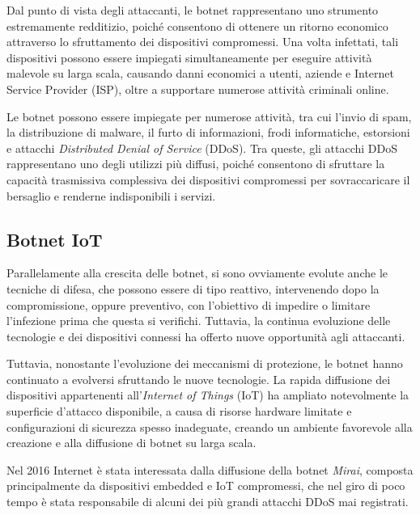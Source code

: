 Dal punto di vista degli attaccanti, le botnet rappresentano uno strumento estremamente redditizio, poiché consentono di ottenere un ritorno economico attraverso lo sfruttamento dei dispositivi compromessi. Una volta infettati, tali dispositivi possono essere impiegati simultaneamente per eseguire attività malevole su larga scala, causando danni economici a utenti, aziende e Internet Service Provider (ISP), oltre a supportare numerose attività criminali online.

Le botnet possono essere impiegate per numerose attività, tra cui l'invio di spam, la distribuzione di malware, il furto di informazioni, frodi informatiche, estorsioni e attacchi \textit{Distributed Denial of Service} (DDoS). Tra queste, gli attacchi DDoS rappresentano uno degli utilizzi più diffusi, poiché consentono di sfruttare la capacità trasmissiva complessiva dei dispositivi compromessi per sovraccaricare il bersaglio e renderne indisponibili i servizi.

\subsection{Botnet IoT} %

Parallelamente alla crescita delle botnet, si sono ovviamente evolute anche le tecniche di difesa, che possono essere di tipo reattivo, intervenendo dopo la compromissione, oppure preventivo, con l'obiettivo di impedire o limitare l'infezione prima che questa si verifichi. Tuttavia, la continua evoluzione delle tecnologie e dei dispositivi connessi ha offerto nuove opportunità agli attaccanti.

Tuttavia, nonostante l'evoluzione dei meccanismi di protezione, le botnet hanno continuato a evolversi sfruttando le nuove tecnologie. La rapida diffusione dei dispositivi appartenenti all'\textit{Internet of Things} (IoT) ha ampliato notevolmente la superficie d'attacco disponibile, a causa di risorse hardware limitate e configurazioni di sicurezza spesso inadeguate, creando un ambiente favorevole alla creazione e alla diffusione di botnet su larga scala.


Nel 2016 Internet è stata interessata dalla diffusione della botnet \textit{Mirai}, composta principalmente da dispositivi embedded e IoT compromessi, che nel giro di poco tempo è stata responsabile di alcuni dei più grandi attacchi DDoS mai registrati.

